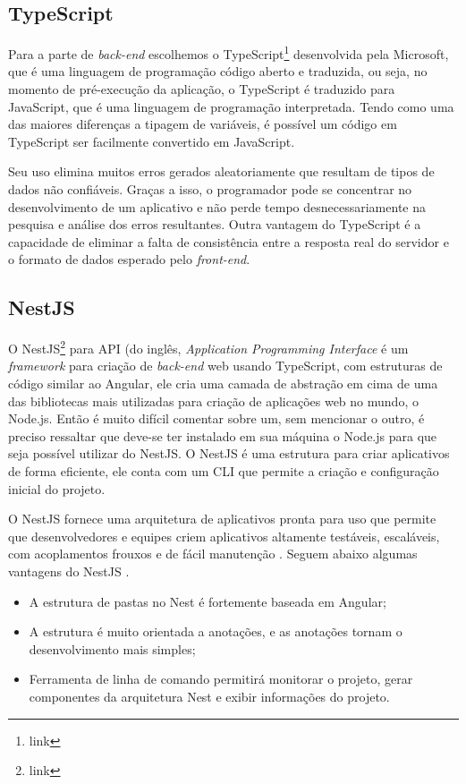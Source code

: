 \subsection{TypeScript}
\label{ssec:TypeScript}
Para a parte de \textit{back-end} escolhemos o TypeScript\footnote{link} desenvolvida pela Microsoft, que é uma linguagem de programação código aberto e traduzida, ou seja, no momento de pré-execução da aplicação, o TypeScript é traduzido para JavaScript, que é uma linguagem de programação interpretada. Tendo como uma das maiores diferenças a tipagem de variáveis, é possível um código em TypeScript ser facilmente convertido em JavaScript. 

Seu uso elimina muitos erros gerados aleatoriamente que resultam de tipos de dados não confiáveis. Graças a isso, o programador pode se concentrar no desenvolvimento de um aplicativo e não perde tempo desnecessariamente na pesquisa e análise dos erros resultantes. Outra vantagem do TypeScript é a capacidade de eliminar a falta de consistência entre a resposta real do servidor e o formato de dados esperado pelo \textit{front-end}.\cite{Jakub2019TypeScript}

\subsection{NestJS}
\label{ssec:NestJS}
O NestJS\footnote{link} para API (do inglês, \textit{Application Programming Interface} é um \textit{framework} para criação de \textit{back-end} web usando TypeScript, com estruturas de código similar ao Angular, ele cria uma camada de abstração em cima de uma das bibliotecas mais utilizadas para criação de aplicações web no mundo, o Node.js.  Então é muito difícil comentar sobre um, sem mencionar o outro, é preciso ressaltar que deve-se ter instalado em sua máquina o Node.js para que seja possível utilizar do NestJS. O NestJS é uma estrutura para criar aplicativos de forma eficiente, ele conta com um CLI que permite a criação e configuração inicial do projeto.

O NestJS fornece uma arquitetura de aplicativos pronta para uso que permite que desenvolvedores e equipes criem aplicativos altamente testáveis, escaláveis, com acoplamentos frouxos e de fácil manutenção \cite{kamil2020nestjs}. Seguem abaixo algumas vantagens do NestJS .

\begin{itemize}
    \item A estrutura de pastas no Nest é fortemente baseada em Angular; 
    \item A estrutura é muito orientada a anotações, e as anotações tornam o desenvolvimento mais simples;   
    \item Ferramenta de linha de comando permitirá monitorar o projeto, gerar componentes da arquitetura Nest e exibir informações do projeto.
\end{itemize}

